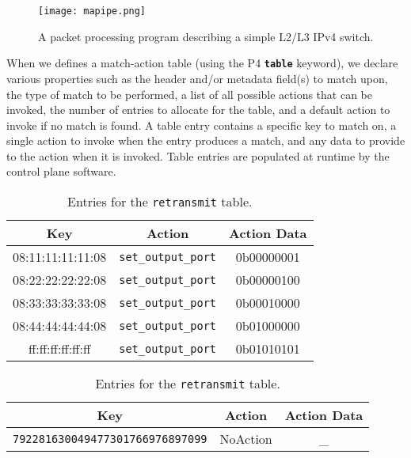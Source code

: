\begin{figure}[!ht]
	\centering
	\texttt{[image: mapipe.png]}
	\caption{A packet processing program describing a simple L2/L3 IPv4 switch.}
	\label{mapipe}
\end{figure}

When we defines a match-action table (using the P4 \textbf{\texttt{table}} keyword), we declare various properties such as the header and/or metadata field(s) to match upon, the type of match to be performed, a list of all possible actions that can be invoked, the number of entries to allocate for the table, and a default action to invoke if no match is found. A table entry contains a specific key to match on, a single action to invoke when the entry produces a match, and any data to provide to the action when it is invoked. Table entries are populated at runtime by the control plane software.

\begin{table}[!h]
	\centering
	\caption{Entries for the \texttt{forward} table.}
	\label{forward}
	\begin{tabular}{ | c | c | c |}
		\hline
		\textbf{Key} & \textbf{Action} & \textbf{Action Data} \\ \hline
		08:11:11:11:11:08 & \verb|set_output_port| & 0b00000001 \\ \hline
		08:22:22:22:22:08 & \verb|set_output_port| & 0b00000100 \\ \hline
		08:33:33:33:33:08 & \verb|set_output_port| & 0b00010000 \\ \hline
		08:44:44:44:44:08 & \verb|set_output_port| & 0b01000000 \\ \hline
		ff:ff:ff:ff:ff:ff & \verb|set_output_port| & 0b01010101 \\ \hline
	\end{tabular}
\vspace{2em}
	\centering
	\caption{Entries for the \texttt{retransmit} table.}
	\label{retransmit}
	\begin{tabular}{ | c | c | c |}
		\hline
		\textbf{Key} & \textbf{Action} & \textbf{Action Data} \\ \hline
		\texttt{792281630049477301766976897099}  & NoAction & \_ \\ \hline
	\end{tabular}
\end{table}

